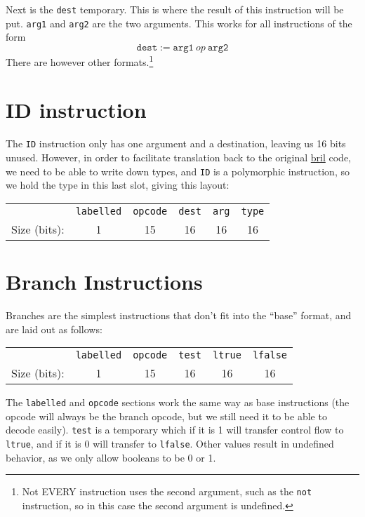 \documentclass{article}
\newcommand{\bril}{\href{https://capra.cs.cornell.edu/bril/}{bril}}
\begin{document}
Next is the \texttt{dest} temporary. This is where the result of this
instruction will be put. \texttt{arg1} and \texttt{arg2} are the two
arguments. This works for all instructions of the form
\[
  \texttt{dest} := \texttt{arg1}\ op\ \texttt{arg2}
\]
There are however other formats.\footnote{Not EVERY instruction uses the second
  argument, such as the \texttt{not} instruction, so in this case the second
  argument is undefined.}
\section{ID instruction}
The \texttt{ID} instruction only has one argument and a destination, leaving us
16 bits unused. However, in order to facilitate translation back to the original
\bril{} code, we need to be able to write down types, and \texttt{ID} is a
polymorphic instruction, so we hold the type in this last slot, giving this
layout:
\begin{center}
  \begin{tabular}{r|c|c|c|c|c|}
    \cline{2-6}
    & \texttt{labelled} & \texttt{opcode} & \texttt{dest} & \texttt{arg}
    & \texttt{type} \\ \cline{2-6}
    Size (bits): & 1 & 15 & 16 & 16 & 16 \\ \cline{2-6}
  \end{tabular}
\end{center}

\section{Branch Instructions}
Branches are the simplest instructions that don't fit into the ``base'' format,
and are laid out as follows:\\
\begin{center}
  \begin{tabular}{r|c|c|c|c|c|}
    \cline{2-6}
    & \texttt{labelled} & \texttt{opcode} & \texttt{test} & \texttt{ltrue}
    & \texttt{lfalse} \\ \cline{2-6}
    Size (bits): & 1 & 15 & 16 & 16 & 16 \\ \cline{2-6}
  \end{tabular}
\end{center}
The \texttt{labelled} and \texttt{opcode} sections work the same way as base
instructions (the opcode will always be the branch opcode, but we still need it
to be able to decode easily). \texttt{test} is a temporary which if it is 1 will
transfer control flow to \texttt{ltrue}, and if it is 0 will transfer to
\texttt{lfalse}. Other values result in undefined behavior, as we only allow
booleans to be 0 or 1.
\end{document}

